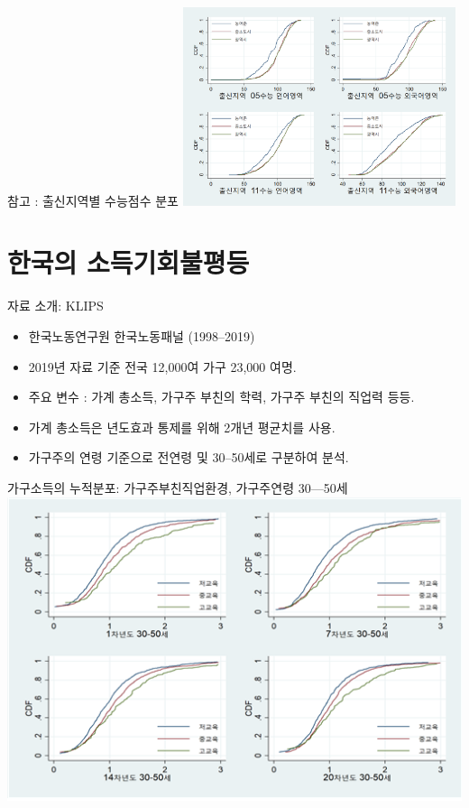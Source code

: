 \documentclass[aspectratio=169,xcolor=dvipsnames,handout]{beamer}
\begin{document}
\begin{frame}{참고 : 출신지역별 수능점수 분포}
  \centering
  \includegraphics[width=0.6\textwidth]{figure/KELS_y56reggrp.png}
\end{frame}

\section{한국의 소득기회불평등}%

\begin{frame}{자료 소개: KLIPS}
  \begin{itemize}
        \item 한국노동연구원 한국노동패널 (1998--2019)
        \item 2019년 자료 기준 전국 12,000여 가구 23,000 여명.
        \item 주요 변수 : 가계 총소득, 가구주 부친의 학력, 가구주 부친의 직업력 등등.
        \item 가계 총소득은 년도효과 통제를 위해 2개년 평균치를 사용.
        \item 가구주의 연령 기준으로 전연령 및 30--50세로 구분하여 분석.
  \end{itemize}
\end{frame}

\begin{frame}{가구소득의 누적분포: 가구주부친직업환경, 가구주연령 30---50세}
  \centering
    \includegraphics[scale=.5]{figure/klips_cdf4_byjob.png}
\end{frame}
\end{document}

